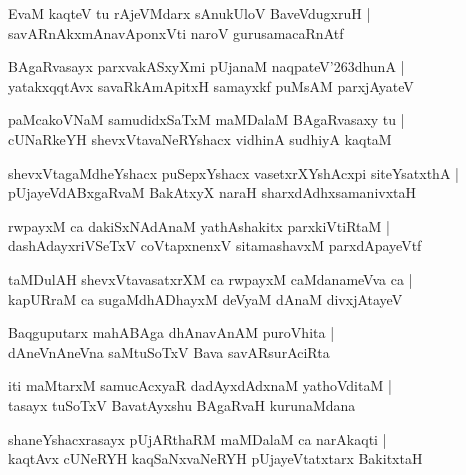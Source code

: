 \documentclass[twoside,12pt,openright]{book}
\def\S{\char'263}
\newcounter{shloka}[chapter]
\begin{document}
\begin{shloka}%
EvaM kaqteV tu rAjeVMdarx sAnukUloV BaveVdugxruH |\\
savARnAkxmAnavAponxVti naroV gurusamacaRnAtf 
\end{shloka}

\begin{shloka}%
BAgaRvasayx parxvakASxyXmi pUjanaM naqpateV\S dhunA |\\
yatakxqqtAvx savaRkAmApitxH samayxkf puMsAM parxjAyateV 
\end{shloka}

\begin{shloka}%
paMcakoVNaM samudidxSaTxM maMDalaM BAgaRvasaxy tu |\\
cUNaRkeYH shevxVtavaNeRYshacx vidhinA sudhiyA kaqtaM 
\end{shloka}

\begin{shloka}%
shevxVtagaMdheYshacx puSepxYshacx vasetxrXYshAcxpi siteYsatxthA |\\
pUjayeVdABxgaRvaM BakAtxyX naraH sharxdAdhxsamanivxtaH 
\end{shloka}

\begin{shloka}%
rwpayxM ca dakiSxNAdAnaM yathAshakitx parxkiVtiRtaM |\\
dashAdayxriVSeTxV coVtapxnenxV sitamashavxM parxdApayeVtf 
\end{shloka}

\begin{shloka}%
taMDulAH shevxVtavasatxrXM ca rwpayxM caMdanameVva ca |\\
kapURraM ca sugaMdhADhayxM deVyaM dAnaM divxjAtayeV 
\end{shloka}

\begin{shloka}%
Baqguputarx mahABAga dhAnavAnAM puroVhita |\\
dAneVnAneVna saMtuSoTxV Bava savARsurAciRta
\end{shloka}

\begin{shloka}%
iti maMtarxM samucAcxyaR dadAyxdAdxnaM yathoVditaM |\\
tasayx tuSoTxV BavatAyxshu BAgaRvaH kurunaMdana
\end{shloka}

\begin{shloka}%
shaneYshacxrasayx pUjARthaRM maMDalaM ca narAkaqti |\\
kaqtAvx cUNeRYH kaqSaNxvaNeRYH pUjayeVtatxtarx BakitxtaH 
\end{shloka}
\end{document}
